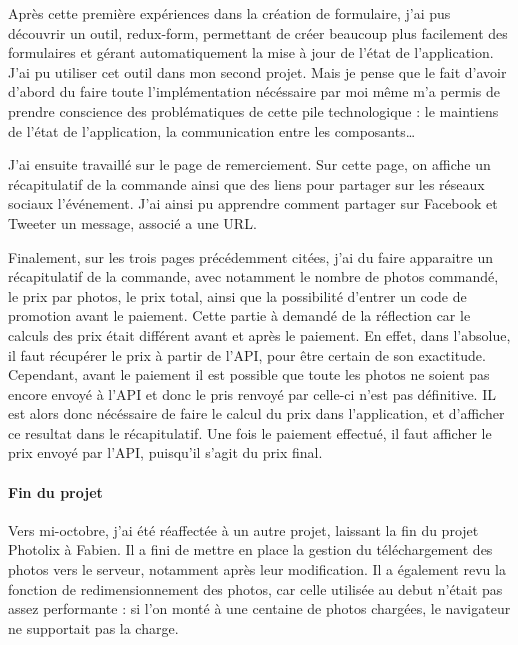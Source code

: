 \bigskip

Après cette première expériences dans la création de formulaire, j'ai
pus découvrir un outil, redux-form, permettant de créer beaucoup plus
facilement des formulaires et gérant automatiquement la mise à jour de
l'état de l'application. J'ai pu utiliser cet outil dans mon second
projet. Mais je pense que le fait d'avoir d'abord du faire toute
l'implémentation nécéssaire par moi même m'a permis de prendre
conscience des problématiques de cette pile technologique : le maintiens
de l'état de l'application, la communication entre les
composants\ldots{}

\bigskip

J'ai ensuite travaillé sur le page de remerciement. Sur cette page, on
affiche un récapitulatif de la commande ainsi que des liens pour
partager sur les réseaux sociaux l'événement. J'ai ainsi pu apprendre
comment partager sur Facebook et Tweeter un message, associé a une URL.

\bigskip

Finalement, sur les trois pages précédemment citées, j'ai du faire
apparaitre un récapitulatif de la commande, avec notamment le nombre de
photos commandé, le prix par photos, le prix total, ainsi que la
possibilité d'entrer un code de promotion avant le paiement. Cette
partie à demandé de la réflection car le calculs des prix était
différent avant et après le paiement. En effet, dans l'absolue, il faut
récupérer le prix à partir de l'API, pour être certain de son
exactitude. Cependant, avant le paiement il est possible que toute les
photos ne soient pas encore envoyé à l'API et donc le pris renvoyé par
celle-ci n'est pas définitive. IL est alors donc nécéssaire de faire le
calcul du prix dans l'application, et d'afficher ce resultat dans le
récapitulatif. Une fois le paiement effectué, il faut afficher le prix
envoyé par l'API, puisqu'il s'agit du prix final.

\bigskip

\paragraph{Fin du projet}\label{fin-du-projet}

\bigskip

Vers mi-octobre, j'ai été réaffectée à un autre projet, laissant la fin
du projet Photolix à Fabien. Il a fini de mettre en place la gestion du
téléchargement des photos vers le serveur, notamment après leur
modification. Il a également revu la fonction de redimensionnement des
photos, car celle utilisée au debut n'était pas assez performante : si
l'on monté à une centaine de photos chargées, le navigateur ne
supportait pas la charge.


